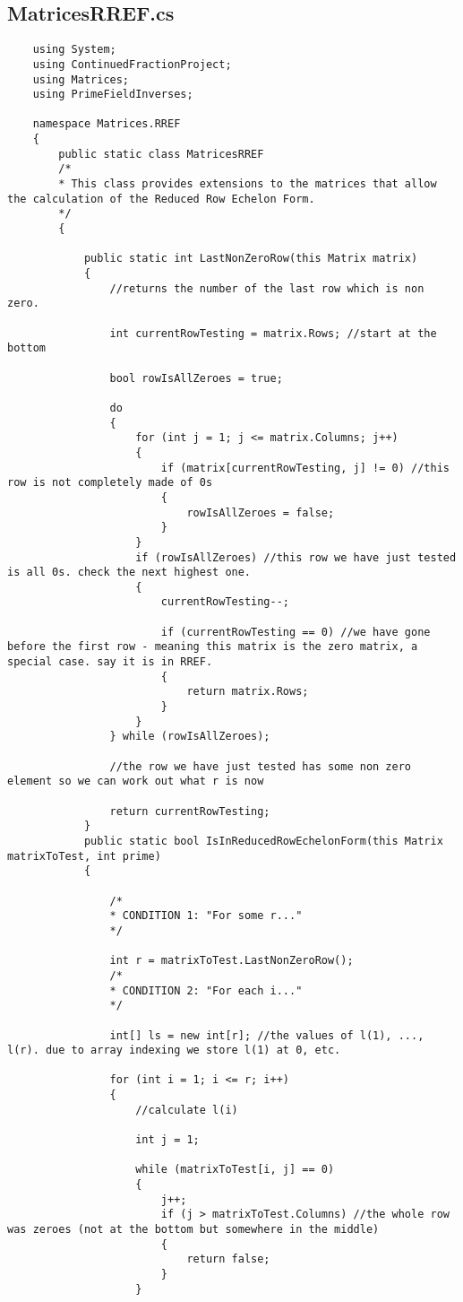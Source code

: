 \documentclass{article}
\begin{document}
\subsection{MatricesRREF.cs}

\begin{lstlisting}
	using System;
	using ContinuedFractionProject;
	using Matrices;
	using PrimeFieldInverses;
	
	namespace Matrices.RREF
	{
		public static class MatricesRREF
		/*
		* This class provides extensions to the matrices that allow the calculation of the Reduced Row Echelon Form.
		*/
		{
			
			public static int LastNonZeroRow(this Matrix matrix)
			{
				//returns the number of the last row which is non zero.
				
				int currentRowTesting = matrix.Rows; //start at the bottom
				
				bool rowIsAllZeroes = true;
				
				do
				{
					for (int j = 1; j <= matrix.Columns; j++)
					{
						if (matrix[currentRowTesting, j] != 0) //this row is not completely made of 0s
						{
							rowIsAllZeroes = false;
						}
					}
					if (rowIsAllZeroes) //this row we have just tested is all 0s. check the next highest one.
					{
						currentRowTesting--;
						
						if (currentRowTesting == 0) //we have gone before the first row - meaning this matrix is the zero matrix, a special case. say it is in RREF.
						{
							return matrix.Rows;
						}
					}
				} while (rowIsAllZeroes);
				
				//the row we have just tested has some non zero element so we can work out what r is now
				
				return currentRowTesting;
			}
			public static bool IsInReducedRowEchelonForm(this Matrix matrixToTest, int prime)
			{
				
				/*
				* CONDITION 1: "For some r..."
				*/
				
				int r = matrixToTest.LastNonZeroRow();
				/*
				* CONDITION 2: "For each i..."
				*/
				
				int[] ls = new int[r]; //the values of l(1), ..., l(r). due to array indexing we store l(1) at 0, etc.
				
				for (int i = 1; i <= r; i++)
				{
					//calculate l(i)
					
					int j = 1;
					
					while (matrixToTest[i, j] == 0)
					{
						j++;
						if (j > matrixToTest.Columns) //the whole row was zeroes (not at the bottom but somewhere in the middle)
						{
							return false;
						}
					}
					

\end{lstlisting}
\end{document}
